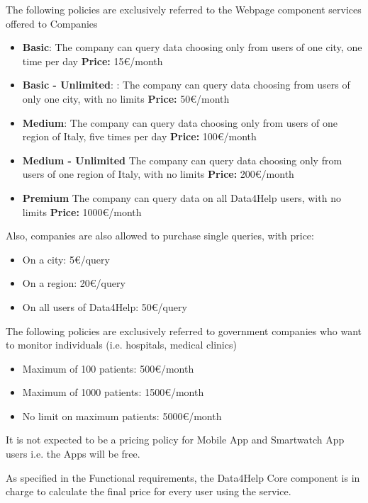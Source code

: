 The following policies are exclusively referred to the Webpage component services offered to Companies

\begin{itemize}
    \item \textbf{Basic}: The company can query data choosing only from users of one city, one time per day
     \textbf{Price:} 15\euro/month
    \item	\textbf{Basic - Unlimited}: : The company can query data choosing from users of only one city, with no limits
\textbf{Price:} 50\euro/month
    \item \textbf{Medium}: The company can query data choosing only from users of one region of Italy, five times per day
\textbf{Price:} 100\euro/month
    \item \textbf{Medium - Unlimited} The company can query data choosing only from users of one region of Italy, with no limits
\textbf{Price:} 200\euro/month
    \item \textbf{Premium} The company can query data on all Data4Help users, with no limits
\textbf{Price:} 1000\euro/month
\end{itemize}

\noindent Also, companies are also allowed to purchase single queries, with price:

\begin{itemize}
    \item On a city: 5\euro/query
    \item On a region: 20\euro/query
    \item On all users of Data4Help: 50\euro/query
\end{itemize}

\noindent The following policies are exclusively referred to government companies who want to monitor individuals (i.e. hospitals, medical clinics) 

\begin{itemize}
    \item Maximum of 100 patients:
500\euro/month
    \item Maximum of 1000 patients: 
1500\euro/month
    \item No limit on maximum patients:
5000\euro/month
\end{itemize}




\noindent It is not expected to be a pricing policy for Mobile App and Smartwatch App users i.e. the Apps will be free.

\noindent As specified in the Functional requirements, the Data4Help Core component is in charge to calculate the final price for every user using the service.







